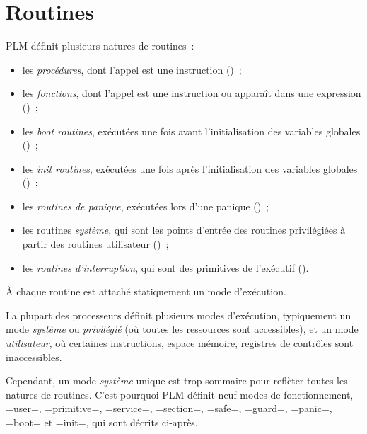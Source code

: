 




\chapter{Routines}

PLM définit plusieurs natures de routines~:
\begin{itemize}
  \item les \emph{procédures}, dont l'appel est une instruction ()~;
  \item les \emph{fonctions}, dont l'appel est une instruction ou apparaît dans une expression ()~;
  \item les \emph{boot routines}, exécutées une fois avant l'initialisation des variables globales ()~;
  \item les \emph{init routines}, exécutées une fois après l'initialisation des variables globales ()~;
  \item les \emph{routines de panique}, exécutées lors d'une panique ()~;
  \item les routines \emph{système}, qui sont les points d'entrée des routines privilégiées à partir des routines utilisateur ()~;
  \item les \emph{routines d'interruption}, qui sont des primitives de l'exécutif ().
\end{itemize}



À chaque routine est attaché statiquement un mode d'exécution.

La plupart des processeurs définit plusieurs modes d'exécution, typiquement un mode \emph{système} ou \emph{privilégié} (où toutes les ressources sont accessibles), et un mode \emph{utilisateur}, où certaines instructions, espace mémoire, registres de contrôles sont inaccessibles.

Cependant, un mode \emph{système} unique est trop sommaire pour reflèter toutes les natures de routines. C'est pourquoi PLM définit neuf modes de fonctionnement, \plm=user=, \plm=primitive=, \plm=service=, \plm=section=, \plm=safe=, \plm=guard=, \plm=panic=, \plm=boot= et \plm=init=, qui sont décrits ci-après.

